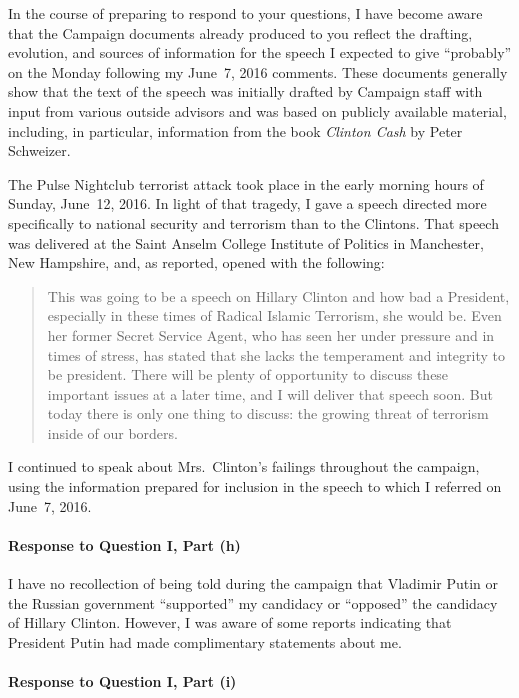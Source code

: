In the course of preparing to respond to your questions, I have become aware that the Campaign documents already produced to you reflect the drafting, evolution, and sources of information for the speech I expected to give ``probably'' on the Monday following my June~7, 2016 comments.
These documents generally show that the text of the speech was initially drafted by Campaign staff with input from various outside advisors and was based on publicly available material, including, in particular, information from the book \textit{Clinton Cash} by Peter Schweizer.

The Pulse Nightclub terrorist attack took place in the early morning hours of Sunday, June~12, 2016.
In light of that tragedy, I gave a speech directed more specifically to national security and terrorism than to the Clintons.
That speech was delivered at the Saint Anselm College Institute of Politics in Manchester, New Hampshire, and, as reported, opened with the following:

\begin{quote}
This was going to be a speech on Hillary Clinton and how bad a President, especially in these times of Radical Islamic Terrorism, she would be.
Even her former Secret Service Agent, who has seen her under pressure and in times of stress, has stated that she lacks the temperament and integrity to be president.
There will be plenty of opportunity to discuss these important issues at a later time, and I will deliver that speech soon.
But today there is only one thing to discuss: the growing threat of terrorism inside of our borders.
\end{quote}

I continued to speak about Mrs.~Clinton's failings throughout the campaign, using the information prepared for inclusion in the speech to which I referred on June~7, 2016.

\paragraph*{Response to Question I, Part (h)}

I have no recollection of being told during the campaign that Vladimir Putin or the Russian government ``supported'' my candidacy or ``opposed'' the candidacy of Hillary Clinton.
However, I was aware of some reports indicating that President Putin had made complimentary statements about me.

\paragraph*{Response to Question I, Part (i)}

